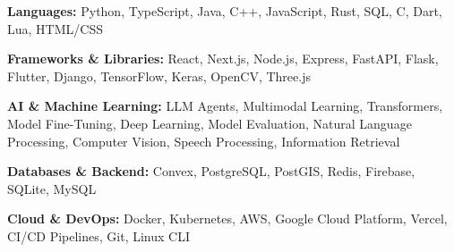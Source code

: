 \documentclass[10pt,letterpaper]{article}
\newcommand{\resumeSection}[1]{%
  \par\vspace{2.7pt}%
  {\fontsize{11.5}{12}\selectfont\bfseries
    \underline{\makebox[\linewidth][l]{#1}}%
  }%
  \par\vspace{2.1pt}%
}
\newcommand{\skill}[2]{\textbf{#1:} #2\par}
\begin{document}
\resumeSection{SKILLS}
\skill{Languages}{Python, TypeScript, Java, C++, JavaScript, Rust, SQL, C, Dart, Lua, HTML/CSS}
\skill{Frameworks \& Libraries}{React, Next.js, Node.js, Express, FastAPI, Flask, Flutter, Django, TensorFlow, Keras, OpenCV, Three.js}
\skill{AI \& Machine Learning}{LLM Agents, Multimodal Learning, Transformers, Model Fine-Tuning, Deep Learning, Model Evaluation, Natural Language Processing, Computer Vision, Speech Processing, Information Retrieval}
\skill{Databases \& Backend}{Convex, PostgreSQL, PostGIS, Redis, Firebase, SQLite, MySQL}
\skill{Cloud \& DevOps}{Docker, Kubernetes, AWS, Google Cloud Platform, Vercel, CI/CD Pipelines, Git, Linux CLI}
\end{document}
